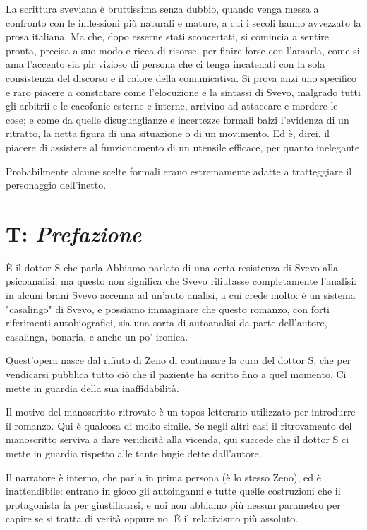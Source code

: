 \documentclass[a4paper, twoside, titlepage]{book}
\begin{document}
La scrittura sveviana è bruttissima senza dubbio, quando venga messa a confronto con le inflessioni più naturali e mature, a cui i secoli hanno avvezzato la prosa italiana. Ma che, dopo esserne stati sconcertati, si comincia a sentire pronta, precisa a suo modo e ricca di risorse, per finire forse con l'amarla, come si ama l'accento sia pir vizioso di persona che ci tenga incatenati con la sola consistenza del discorso e il calore della comunicativa. Si prova anzi uno specifico e raro piacere a constatare come l'elocuzione e la sintassi di Svevo, malgrado tutti gli arbitrii e le cacofonie esterne e interne, arrivino ad attaccare e mordere le cose; e come da quelle disuguaglianze e incertezze formali balzi l'evidenza di un ritratto, la netta figura di una situazione o di un movimento. Ed è, direi, il piacere di assistere al funzionamento di un utensile efficace, per quanto inelegante

Probabilmente alcune scelte formali erano estremamente adatte a tratteggiare il personaggio dell'inetto.

\section{T: \textit{Prefazione}}

È il dottor S che parla
Abbiamo parlato di una certa resistenza di Svevo alla psicoanalisi, ma questo non significa che Svevo rifiutasse completamente l'analisi: in alcuni brani Svevo accenna ad un'auto analisi, a cui crede molto: è un sistema "casalingo" di Svevo, e possiamo immaginare che questo romanzo, con forti riferimenti autobiografici, sia una sorta di autoanalisi da parte dell'autore, casalinga, bonaria, e anche un po' ironica.

Quest'opera nasce dal rifiuto di Zeno di continuare la cura del dottor S, che per vendicarsi pubblica tutto ciò che il paziente ha scritto fino a quel momento.
Ci mette in guardia della sua inaffidabilità.

Il motivo del manoscritto ritrovato è un topos letterario utilizzato per introdurre il romanzo. Qui è qualcosa di molto simile.
Se negli altri casi il ritrovamento del manoscritto serviva a dare veridicità alla vicenda, qui succede che il dottor S ci mette in guardia rispetto alle tante bugie dette dall'autore.

Il narratore è interno, che parla in prima persona (è lo stesso Zeno), ed è inattendibile: entrano in gioco gli autoinganni e tutte quelle costruzioni che il protagonista fa per giustificarsi, e noi non abbiamo più nessun parametro per capire se si tratta di verità oppure no. È il relativismo più assoluto.
\end{document}
